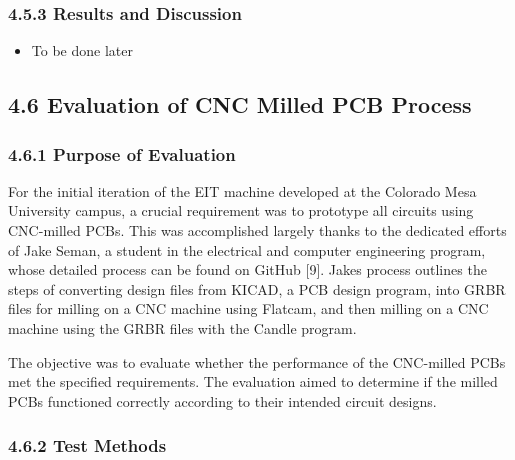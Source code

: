 \subsubsection*{\texorpdfstring{\textbf{4.5.3 Results and
Discussion}~}{4.5.3 Results and Discussion~}}\label{results-and-discussion-3}

\begin{itemize}
\item
  To be done later
\end{itemize}

\subsection*{4.6 Evaluation of CNC Milled PCB
Process}\label{evaluation-of-cnc-milled-pcb-process}

\subsubsection*{\texorpdfstring{\textbf{4.6.1 Purpose of
Evaluation}~}{4.6.1 Purpose of Evaluation~}}\label{purpose-of-evaluation-4}

For the initial iteration of the EIT machine developed at the Colorado
Mesa University campus, a crucial requirement was to prototype all
circuits using CNC-milled PCBs. This was accomplished largely thanks to
the dedicated efforts of Jake Seman, a student in the electrical and
computer engineering program, whose detailed process can be found on
GitHub {[}9{]}. Jake\textquotesingle s process outlines the steps of
converting design files from KICAD, a PCB design program, into GRBR
files for milling on a CNC machine using Flatcam, and then milling on a
CNC machine using the GRBR files with the Candle program.

The objective was to evaluate whether the performance of the CNC-milled
PCBs met the specified requirements. The evaluation aimed to determine
if the milled PCBs functioned correctly according to their intended
circuit designs.

\subsubsection*{\texorpdfstring{\textbf{4.6.2 Test
Methods}}{4.6.2 Test Methods}}\label{test-methods-4}

